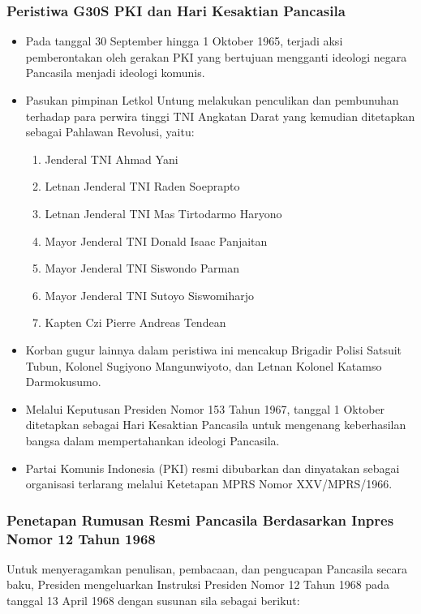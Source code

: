 \subsubsection{Peristiwa G30S PKI dan Hari Kesaktian Pancasila}

\begin{itemize}
\item Pada tanggal 30 September hingga 1 Oktober 1965, terjadi aksi pemberontakan oleh gerakan PKI yang bertujuan mengganti ideologi negara Pancasila menjadi ideologi komunis.
\item Pasukan pimpinan Letkol Untung melakukan penculikan dan pembunuhan terhadap para perwira tinggi TNI Angkatan Darat yang kemudian ditetapkan sebagai Pahlawan Revolusi, yaitu:
  \begin{enumerate}
  \item Jenderal TNI Ahmad Yani
  \item Letnan Jenderal TNI Raden Soeprapto
  \item Letnan Jenderal TNI Mas Tirtodarmo Haryono
  \item Mayor Jenderal TNI Donald Isaac Panjaitan
  \item Mayor Jenderal TNI Siswondo Parman
  \item Mayor Jenderal TNI Sutoyo Siswomiharjo
  \item Kapten Czi Pierre Andreas Tendean
  \end{enumerate}
\item Korban gugur lainnya dalam peristiwa ini mencakup Brigadir Polisi Satsuit Tubun, Kolonel Sugiyono Mangunwiyoto, dan Letnan Kolonel Katamso Darmokusumo.
\item Melalui Keputusan Presiden Nomor 153 Tahun 1967, tanggal 1 Oktober ditetapkan sebagai Hari Kesaktian Pancasila untuk mengenang keberhasilan bangsa dalam mempertahankan ideologi Pancasila.
\item Partai Komunis Indonesia (PKI) resmi dibubarkan dan dinyatakan sebagai organisasi terlarang melalui Ketetapan MPRS Nomor XXV/MPRS/1966.
\end{itemize}

\subsubsection{Penetapan Rumusan Resmi Pancasila Berdasarkan Inpres Nomor 12 Tahun 1968}

Untuk menyeragamkan penulisan, pembacaan, dan pengucapan Pancasila secara baku, Presiden mengeluarkan Instruksi Presiden Nomor 12 Tahun 1968 pada tanggal 13 April 1968 dengan susunan sila sebagai berikut:

